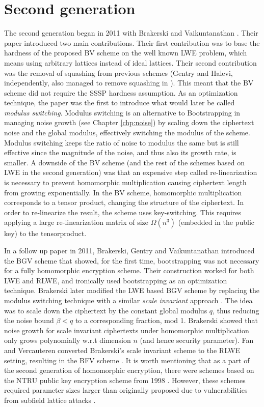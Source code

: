 \section{Second generation}
The second generation began in 2011 with Brakerski and Vaikuntanathan \cite{BV11}. Their paper introduced two main contributions. Their first contribution was to base the hardness of the proposed BV scheme on the well known LWE problem, which means using arbitrary lattices instead of ideal lattices. Their second contribution was the removal of squashing from previous schemes (Gentry and Halevi, independently, also managed to remove squashing in \cite{Gen-Hal-no-squash}). This meant that the BV scheme did not require the SSSP hardness assumption. As an optimization technique, the paper was the first to introduce what would later be called \emph{modulus switching}. Modulus switching is an alternative to Bootstrapping in managing noise growth (see Chapter \ref{chp:noise}) by scaling down the ciphertext noise and the global modulus, effectively switching the modulus of the scheme. Modulus switching keeps the ratio of noise to modulus the same but is still effective since the magnitude of the noise, and thus also its growth rate, is smaller. A downside of the BV scheme (and the rest of the schemes based on LWE in the second generation) was that an expensive step called re-linearization is necessary to prevent homomorphic multiplication causing ciphertext length from growing exponentially. In the BV scheme, homomorphic multiplication corresponds to a tensor product, changing the structure of the ciphertext. In order to re-linearize the result, the scheme uses key-switching. This requires applying a large re-linearization matrix of size $\Omega(n^3)$ (embedded in the public key) to the tensorproduct.

In a follow up paper in 2011, Brakerski, Gentry and Vaikuntanathan introduced the BGV scheme that showed, for the first time, bootstrapping was not necessary for a fully homomorphic encryption scheme. Their construction worked for both LWE and RLWE, and ironically used bootstrapping as an optimization technique. Brakerski later modified the LWE based BGV scheme by replacing the modulus switching technique with a similar \emph{scale invariant} approach \cite{Bra12-BFV}. The idea was to scale down the ciphertext by the constant global modulus $q$, thus reducing the noise bound $\beta < q$ to a corresponding fraction, mod 1. Brakerski showed that noise growth for scale invariant ciphertexts under homomorphic multiplication only grows polynomially w.r.t dimension $n$ (and hence security parameter). Fan and Vercauteren converted Brakerski's scale invariant scheme to the RLWE setting, resulting in the BFV scheme \cite{FV12-BFV}. It is worth mentioning that as a part of the second generation of homomorphic encryption, there were schemes based on the NTRU public key encryption scheme from 1998 \cite{NTRU}. However, these schemes required parameter sizes larger than originally proposed due to vulnerabilities from subfield lattice attacks \cite{NTRU-attack}.


